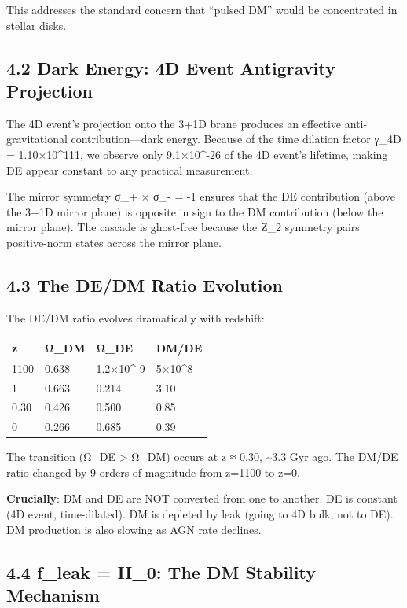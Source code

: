 \documentclass[11pt,a4paper]{article}
\begin{document}
This addresses the standard concern that ``pulsed DM'' would be
concentrated in stellar disks.

\hypertarget{dark-energy-4d-event-antigravity-projection}{%
\subsection{4.2 Dark Energy: 4D Event Antigravity
Projection}\label{dark-energy-4d-event-antigravity-projection}}

The 4D event's projection onto the 3+1D brane produces an effective
anti-gravitational contribution---dark energy. Because of the time
dilation factor γ\_4D = 1.10×10\^{}111, we observe only 9.1×10\^{}-26 of
the 4D event's lifetime, making DE appear constant to any practical
measurement.

The mirror symmetry σ\_+ × σ\_- = -1 ensures that the DE contribution
(above the 3+1D mirror plane) is opposite in sign to the DM contribution
(below the mirror plane). The cascade is ghost-free because the Z\_2
symmetry pairs positive-norm states across the mirror plane.

\hypertarget{the-dedm-ratio-evolution}{%
\subsection{4.3 The DE/DM Ratio
Evolution}\label{the-dedm-ratio-evolution}}

The DE/DM ratio evolves dramatically with redshift:

\begin{longtable}[]{@{}llll@{}}
\toprule
z & Ω\_DM & Ω\_DE & DM/DE \\
\midrule
\endhead
1100 & 0.638 & 1.2×10\^{}-9 & 5×10\^{}8 \\
1 & 0.663 & 0.214 & 3.10 \\
0.30 & 0.426 & 0.500 & 0.85 \\
0 & 0.266 & 0.685 & 0.39 \\
\bottomrule
\end{longtable}

The transition (Ω\_DE \textgreater{} Ω\_DM) occurs at z ≈ 0.30,
\textasciitilde3.3 Gyr ago. The DM/DE ratio changed by 9 orders of
magnitude from z=1100 to z=0.

\textbf{Crucially}: DM and DE are NOT converted from one to another. DE
is constant (4D event, time-dilated). DM is depleted by leak (going to
4D bulk, not to DE). DM production is also slowing as AGN rate declines.

\hypertarget{f_leak-h_0-the-dm-stability-mechanism}{%
\subsection{4.4 f\_leak = H\_0: The DM Stability
Mechanism}\label{f_leak-h_0-the-dm-stability-mechanism}}
\end{document}
